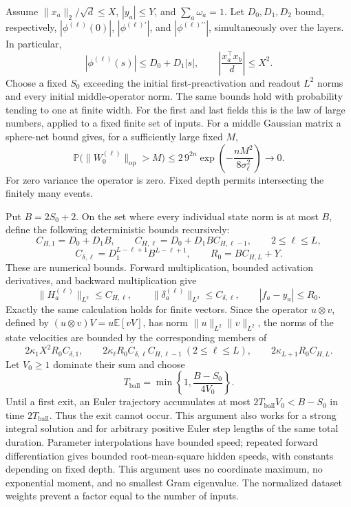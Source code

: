 Assume $\|x_a\|_2/\sqrt d\le X$, $|y_a|\le Y$, and
$\sum_a\omega_a=1$.  Let $D_0,D_1,D_2$ bound, respectively,
$|\phi^{(\ell)}(0)|$, $|\phi^{(\ell)\prime}|$, and
$|\phi^{(\ell)\prime\prime}|$, simultaneously over the layers.
In particular,
\[
 |\phi^{(\ell)}(s)|\le D_0+D_1|s|,
 \qquad \left|\frac{x_a^\top x_b}{d}\right|\le X^2.
\]
Choose a fixed $S_0$ exceeding the initial first-preactivation and
readout $L^2$ norms and every initial middle-operator norm.  The same
bounds hold with probability tending to one at finite width.  For the
first and last fields this is the law of large numbers, applied to a
fixed finite set of inputs.  For a middle Gaussian matrix a sphere-net
bound gives, for a sufficiently large fixed $M$,
\[
 \mathbb P\bigl(\|W_0^{(\ell)}\|_{\operatorname{op}}>M\bigr)
 \le 2\,9^{2n}
       \exp\!\left(-\frac{nM^2}{8\sigma_\ell^2}\right)
 \longrightarrow0.
\]
For zero variance the operator is zero.  Fixed depth permits intersecting
the finitely many events.

Put $B=2S_0+2$.  On the set where every individual state norm is at most
$B$, define the following deterministic bounds recursively:
\[
 C_{H,1}=D_0+D_1B,\qquad
 C_{H,\ell}=D_0+D_1BC_{H,\ell-1},\qquad 2\le\ell\le L,
\]
\[
 C_{\delta,\ell}=D_1^{L-\ell+1}B^{L-\ell+1},
 \qquad R_0=BC_{H,L}+Y.
\]
These are numerical bounds.  Forward multiplication, bounded activation
derivatives, and
backward multiplication give
\[
 \|H_a^{(\ell)}\|_{L^2}\le C_{H,\ell},\qquad
 \|\delta_a^{(\ell)}\|_{L^2}\le C_{\delta,\ell},\qquad
 |f_a-y_a|\le R_0.
\]
Exactly the same calculation holds for finite vectors.  Since the
operator $u\otimes v$, defined by
$(u\otimes v)V=u\mathbb E[vV]$, has norm
$\|u\|_{L^2}\|v\|_{L^2}$, the norms of the state velocities are bounded
by the corresponding members of
\[
 2\kappa_1X^2R_0C_{\delta,1},\qquad
 2\kappa_\ell R_0C_{\delta,\ell}C_{H,\ell-1}\ (2\le\ell\le L),\qquad
 2\kappa_{L+1}R_0C_{H,L}.
\]
Let $V_0\ge1$ dominate their sum and choose
\[
 T_{\mathrm{ball}}=
 \min\left\{1,\frac{B-S_0}{4V_0}\right\}.
\]
Until a first exit, an Euler trajectory accumulates at most
$2T_{\mathrm{ball}}V_0<B-S_0$ in time $2T_{\mathrm{ball}}$.
Thus the exit cannot occur.  This argument also works for a strong
integral solution and for arbitrary positive Euler step lengths of the
same total duration.  Parameter interpolations have bounded speed;
repeated forward differentiation gives bounded root-mean-square hidden
speeds, with constants depending on fixed depth.  This argument uses no
coordinate maximum, no exponential moment, and no smallest Gram
eigenvalue.  The normalized dataset weights prevent a factor equal to
the number of inputs.

